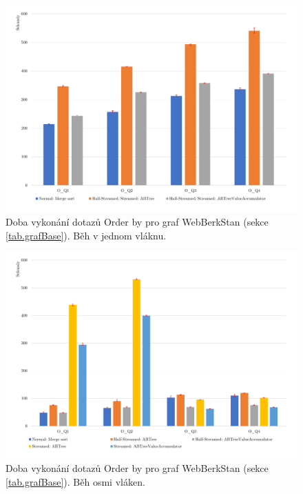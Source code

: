 \begin{figure}[!htp]
\includegraphics[width=\linewidth]{../img/webberkstanOrderByST.pdf}\centering
\caption{Doba vykonání dotazů Order by pro graf WebBerkStan (sekce \ref{tab.grafBase}). Běh v jednom vláknu.}
\label{figure.webberkstanOrderST}
\end{figure}
\begin{figure}[!htp]
\includegraphics[width=\linewidth]{../img/webberkstanOrderByPar.pdf}\centering
\caption{Doba vykonání dotazů Order by pro graf WebBerkStan (sekce \ref{tab.grafBase}).  Běh osmi vláken.}
\label{figure.webberkstanOrderPar}
\end{figure}

\clearpage

